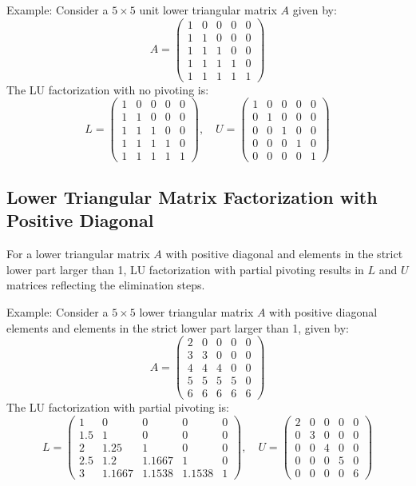 \documentclass{article}
\begin{document}
Example:
Consider a \( 5 \times 5 \) unit lower triangular matrix \( A \) given by:
\[ A = \begin{pmatrix} 1 & 0 & 0 & 0 & 0 \\ 1 & 1 & 0 & 0 & 0 \\ 1 & 1 & 1 & 0 & 0 \\ 1 & 1 & 1 & 1 & 0 \\ 1 & 1 & 1 & 1 & 1 \end{pmatrix} \]
The LU factorization with no pivoting is:
\[ L = \begin{pmatrix} 1 & 0 & 0 & 0 & 0 \\ 1 & 1 & 0 & 0 & 0 \\ 1 & 1 & 1 & 0 & 0 \\ 1 & 1 & 1 & 1 & 0 \\ 1 & 1 & 1 & 1 & 1 \end{pmatrix}, \quad U = \begin{pmatrix} 1 & 0 & 0 & 0 & 0 \\ 0 & 1 & 0 & 0 & 0 \\ 0 & 0 & 1 & 0 & 0 \\ 0 & 0 & 0 & 1 & 0 \\ 0 & 0 & 0 & 0 & 1 \end{pmatrix} \]

\subsection{Lower Triangular Matrix Factorization with Positive Diagonal}
For a lower triangular matrix \( A \) with positive diagonal and elements in the strict lower part larger than 1, LU factorization with partial pivoting results in \( L \) and \( U \) matrices reflecting the elimination steps.

Example:
Consider a \( 5 \times 5 \) lower triangular matrix \( A \) with positive diagonal elements and elements in the strict lower part larger than 1, given by:
\[ A = \begin{pmatrix} 2 & 0 & 0 & 0 & 0 \\ 3 & 3 & 0 & 0 & 0 \\ 4 & 4 & 4 & 0 & 0 \\ 5 & 5 & 5 & 5 & 0 \\ 6 & 6 & 6 & 6 & 6 \end{pmatrix} \]
The LU factorization with partial pivoting is:
\[ L = \begin{pmatrix} 1 & 0 & 0 & 0 & 0 \\ 1.5 & 1 & 0 & 0 & 0 \\ 2 & 1.25 & 1 & 0 & 0 \\ 2.5 & 1.2 & 1.1667 & 1 & 0 \\ 3 & 1.1667 & 1.1538 & 1.1538 & 1 \end{pmatrix}, \quad U = \begin{pmatrix} 2 & 0 & 0 & 0 & 0 \\ 0 & 3 & 0 & 0 & 0 \\ 0 & 0 & 4 & 0 & 0 \\ 0 & 0 & 0 & 5 & 0 \\ 0 & 0 & 0 & 0 & 6 \end{pmatrix} \]
\end{document}
